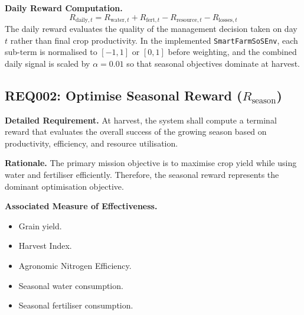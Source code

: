 \vspace{0.2cm}
\noindent\textbf{Daily Reward Computation.}
\begin{equation}
R_{\text{daily},t}= R_{\text{water},t} + R_{\text{fert},t} - R_{\text{resource},t} - R_{\text{losses},t}
\label{eq:daily_reward}
\end{equation}
The daily reward evaluates the quality of the management decision taken on day $t$
rather than final crop productivity. In the implemented \texttt{SmartFarmSoSEnv},
each sub-term is normalised to $[-1,1]$ or $[0,1]$ before weighting, and the
combined daily signal is scaled by $\alpha=0.01$ so that seasonal objectives
dominate at harvest.

\subsection{REQ002: Optimise Seasonal Reward ($R_{\text{season}}$)}

\noindent\textbf{Detailed Requirement.}
At harvest, the system shall compute a terminal reward that evaluates the overall
success of the growing season based on productivity, efficiency, and resource
utilisation.

\vspace{0.2cm}
\noindent\textbf{Rationale.}
The primary mission objective is to maximise crop yield while using water and fertiliser
efficiently. Therefore, the seasonal reward represents the dominant optimisation
objective.

\vspace{0.2cm}
\noindent\textbf{Associated Measure of Effectiveness.}
\begin{itemize}
    \item Grain yield.
    \item Harvest Index.
    \item Agronomic Nitrogen Efficiency.
    \item Seasonal water consumption.
    \item Seasonal fertiliser consumption.
\end{itemize}

